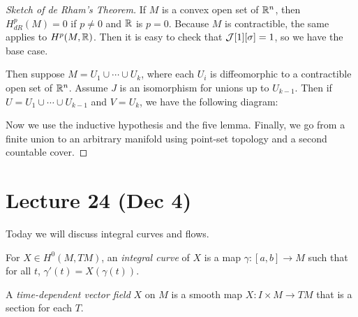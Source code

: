 \documentclass[twoside, 10pt]{article}
\begin{document}
    \begin{proof}[Sketch of de Rham's Theorem] If $M$ is a convex open set of
        $\mathbb{R}^n$, then $H^p_{dR}(M) = 0$ if $p \neq 0$ and $\mathbb{R}$ is $p=0$. Because
        $M$ is contractible, the same applies to $H^p(M, \mathbb{R})$. Then it is easy
        to check that $\mathcal{J}[1][\sigma] = 1$, so we have the base case.

        Then suppose $M = U_1 \cup \cdots \cup U_k$, where each $U_i$ is
        diffeomorphic to a contractible open set of $\mathbb{R}^n$. Assume $J$ is an
        isomorphism for unions up to $U_{k-1}$. Then if $U = U_1 \cup \cdots
        \cup U_{k-1}$ and $V = U_k$, we have the following diagram:

        \begin{center}  \end{center}

        Now we use the inductive hypothesis and the five lemma. Finally, we go
    from a finite union to an arbitrary manifold using point-set topology and a
second countable cover.  \end{proof}

    \section{Lecture 24 (Dec 4)}%
    
    Today we will discuss integral curves and flows. 

    \begin{defn} For $X \in H^0(M, TM)$, an \textit{integral curve} of $X$ is a
    map $\gamma: [a,b] \to M$ such that for all $t$, $\gamma'(t) =
X(\gamma(t))$.  \end{defn}

    \begin{defn} A \textit{time-dependent vector field} $X$ on $M$ is a smooth
    map $X: I \times M \to TM$ that is a section for each $T$.  \end{defn}
\end{document}
